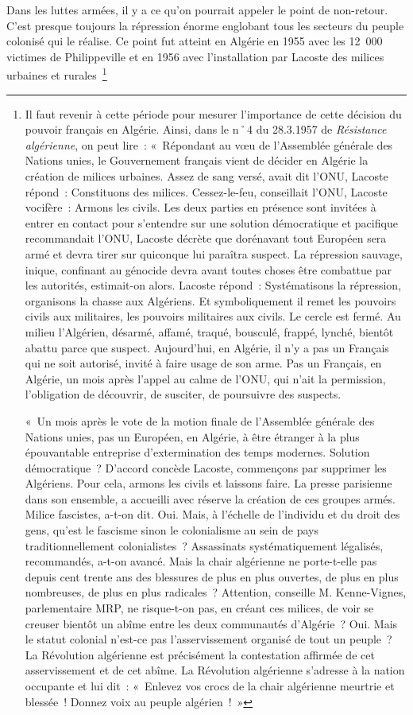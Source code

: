 \documentclass[french,twoside]{book} %
\begin{document}
Dans les luttes armées, il y a ce qu’on pourrait appeler le point de non-retour. C’est presque toujours la répression énorme englobant tous les secteurs du peuple colonisé qui le réalise. Ce point fut atteint en Algérie en 1955 avec les 12 000 victimes de   Philippeville et en 1956 avec l’installation par Lacoste des milices urbaines et rurales \footnote{ \noindent Il faut revenir à cette période pour mesurer l’importance de cette décision du pouvoir français en Algérie. Ainsi, dans le n˚4 du 28.3.1957 de \emph{Résistance algérienne}, on peut lire : « Répondant au vœu de l’Assemblée générale des Nations unies, le Gouvernement français vient de décider en Algérie la création de milices urbaines. Assez de sang versé, avait dit l’ONU, Lacoste répond : Constituons des milices. Cessez-le-feu, conseillait l’ONU, Lacoste vocifère : Armons les civils. Les deux parties en présence sont invitées à entrer en contact pour s’entendre sur une solution démocratique et pacifique recommandait l’ONU, Lacoste décrète que dorénavant tout Européen sera armé et devra tirer sur quiconque lui paraîtra suspect. La répression sauvage, inique, confinant au génocide devra avant toutes choses être combattue par les autorités, estimait-on alors. Lacoste répond : Systématisons la répression, organisons la chasse aux Algériens. Et symboliquement il remet les pouvoirs civils aux militaires, les pouvoirs militaires aux civils. Le cercle est fermé. Au milieu l’Algérien, désarmé, affamé, traqué, bousculé, frappé, lynché, bientôt abattu parce que suspect. Aujourd’hui, en Algérie, il n’y a pas un Français qui ne soit autorisé, invité à faire usage de son arme. Pas un Français, en Algérie, un mois après l’appel au calme de l’ONU, qui n’ait la permission, l’obligation de découvrir, de susciter, de poursuivre des suspects.\par
 « Un mois après le vote de la motion finale de l’Assemblée générale des Nations unies, pas un Européen, en Algérie, à être étranger à la plus épouvantable entreprise d’extermination des temps modernes. Solution démocratique ? D’accord concède Lacoste, commençons par supprimer les Algériens. Pour cela, armons les civils et laissons faire. La presse parisienne dans son ensemble, a accueilli avec réserve la création de ces groupes armés. Milice fascistes, a-t-on dit. Oui. Mais, à l’échelle de l’individu et du droit des gens, qu’est le fascisme sinon le colonialisme au sein de pays traditionnellement colonialistes ? Assassinats systématiquement légalisés, recommandés, a-t-on avancé. Mais la chair algérienne ne porte-t-elle pas depuis cent trente ans des blessures de plus en plus ouvertes, de plus en plus nombreuses, de plus en plus radicales ? Attention, conseille M. Kenne-Vignes, parlementaire MRP, ne risque-t-on pas, en créant ces milices, de voir se creuser bientôt un abîme entre les deux communautés d’Algérie ? Oui. Mais le statut colonial n’est-ce pas l’asservissement organisé de tout un peuple ? La Révolution algérienne est précisément la contestation affirmée de cet asservissement et de cet abîme. La Révolution algérienne s’adresse à la nation occupante et lui dit : « Enlevez vos crocs de la chair algérienne meurtrie et blessée ! Donnez voix au peuple algérien ! »\par
}
\end{document}
